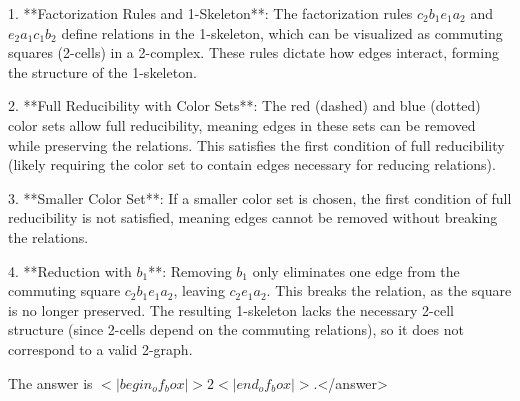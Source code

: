 1. **Factorization Rules and 1-Skeleton**: The factorization rules \( c_2 b_1 e_1 a_2 \) and \( e_2 a_1 c_1 b_2 \) define relations in the 1-skeleton, which can be visualized as commuting squares (2-cells) in a 2-complex. These rules dictate how edges interact, forming the structure of the 1-skeleton.  

2. **Full Reducibility with Color Sets**: The red (dashed) and blue (dotted) color sets allow full reducibility, meaning edges in these sets can be removed while preserving the relations. This satisfies the first condition of full reducibility (likely requiring the color set to contain edges necessary for reducing relations).  

3. **Smaller Color Set**: If a smaller color set is chosen, the first condition of full reducibility is not satisfied, meaning edges cannot be removed without breaking the relations.  

4. **Reduction with \( b_1 \)**: Removing \( b_1 \) only eliminates one edge from the commuting square \( c_2 b_1 e_1 a_2 \), leaving \( c_2 e_1 a_2 \). This breaks the relation, as the square is no longer preserved. The resulting 1-skeleton lacks the necessary 2-cell structure (since 2-cells depend on the commuting relations), so it does not correspond to a valid 2-graph.  

The answer is \(<|begin_of_box|>2<|end_of_box|>\).</answer>